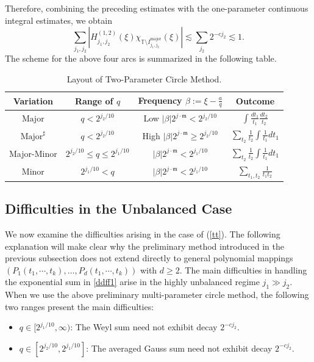 \documentclass[11 pt,letterpaper]{amsart}
\theoremstyle{plain}
\theoremstyle{definition}
\theoremstyle{remark} \theoremstyle{exam} \theoremstyle{ob}
\numberwithin{equation}{section}
\begin{document}
Therefore, combining the preceding estimates with the one-parameter continuous integral estimates, we obtain
\[
\sum_{j_1,j_2}
\left|
H_{j_1,j_2}^{(1,2)}(\xi)
\chi_{\mathbb{T} \setminus I^{\mathrm{major}}_{j_1,j_2}}(\xi)
\right|
\lesssim
\sum_{j_2}2^{-cj_2}
\lesssim1.
\]
The scheme for  the above four arcs is summarized in the following
table.  \begin{table}[H]
	\centering
	\caption{Layout of Two-Parameter Circle Method.}
	\label{t2}
	\begin{tabular}{c|c|c|c}
		\noalign{\smallskip}\noalign{\smallskip}
		\hline\hline
		Variation& Range of $q$ & Frequency $\beta:=\xi-\frac{a}{q} $ &Outcome \\
		\hline
		$\text{Major}$  & $ q<2^{ j_2/10} $ & Low $|\beta|2^{j\cdot \mathfrak{m}}<2^{ j_2/10} $ & $\int \frac{dt_1}{t_1}\frac{dt_2}{t_2} $\\
		\hline
		$\text{Major}^{\sharp}$&$q<2^{ j_2/10} $  &High $| \beta|2^{j\cdot \mathfrak{m}}\ge 2^{ j_2/10} $ & $\sum_{t_2}\frac{1}{t_2} \int \frac{1}{t_1}dt_1$ \\
		\hline
		Major-Minor & $2^{ j_2/10}\le q\le 2^{j_1/10} $ & $|\beta|2^{j\cdot \mathfrak{m}}<2^{j_1/10}$ &$\sum_{t_2}\frac{1}{t_2}\int \frac{1}{t_1}dt_1 $ \\
		\hline
		Minor &  $2^{j_1/10}  <q$ & $|\beta|2^{j\cdot \mathfrak{m}}<2^{j_1/10}$ &$\sum_{t_1,t_2} \frac{1}{t_1t_2} $\\
		\hline
		\hline
	\end{tabular}
\end{table} 







\subsection{Difficulties in the Unbalanced Case}\label{sec340}
We now examine the difficulties arising in the case of (\ref{tt}). The following explanation will make clear why the preliminary method introduced in the previous subsection does not extend directly to general polynomial mappings $(P_1(t_1,\cdots,t_k),\ldots,P_d(t_1,\cdots,t_k))$  with $d\ge 2$.   The main difficulties in handling the exponential sum in
\eqref{ddff1} arise in the highly unbalanced regime
$j_1\gg j_2$.  When we use the above preliminary multi-parameter circle method, the following two ranges present the main difficulties:
\begin{itemize}
	\item[(i)] $q \in [2^{j_1/10},\infty)$:  
	The Weyl sum need not exhibit decay $2^{-c j_2}$.
	
	\item[(ii)] $q \in [2^{j_2/10}, 2^{j_1/10}]$:  
	The averaged Gauss sum need not exhibit decay  $2^{-c j_2}$.
\end{itemize}
\end{document}
